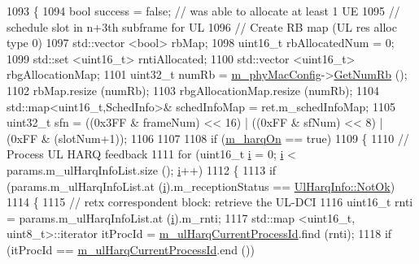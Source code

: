 \begin{DoxyCode}
1093 \{
1094         \textcolor{keywordtype}{bool} success = \textcolor{keyword}{false}; \textcolor{comment}{// was able to allocate at least 1 UE}
1095         \textcolor{comment}{// schedule slot in n+3th subframe for UL}
1096         \textcolor{comment}{// Create RB map (UL res alloc type 0)}
1097         std::vector <bool> rbMap;
1098   uint16\_t rbAllocatedNum = 0;
1099         std::set <uint16\_t> rntiAllocated;
1100         std::vector <uint16\_t> rbgAllocationMap;
1101         uint32\_t numRb = \hyperlink{classns3_1_1MmWaveMacScheduler_a24d7af4971d2e500fe543cefbafa2fd9}{m\_phyMacConfig}->\hyperlink{classns3_1_1MmWavePhyMacCommon_a4c5f323fd722d6eec52efda5d76f97ad}{GetNumRb} ();
1102         rbMap.resize (numRb);
1103         rbgAllocationMap.resize (numRb);
1104         std::map<uint16\_t,SchedInfo>& schedInfoMap = ret.m\_schedInfoMap;
1105         uint32\_t sfn =  ((0x3FF & frameNum) << 16) | ((0xFF & sfNum) << 8) | (0xFF & (slotNum+1));
1106 
1107 
1108         \textcolor{keywordflow}{if} (\hyperlink{classns3_1_1MmWaveRrMacScheduler_ad8bb79b5853000b363b42a158633a942}{m\_harqOn} == \textcolor{keyword}{true})
1109         \{
1110                 \textcolor{comment}{//   Process UL HARQ feedback}
1111                 \textcolor{keywordflow}{for} (uint16\_t \hyperlink{bernuolliDistribution_8m_a6f6ccfcf58b31cb6412107d9d5281426}{i} = 0; \hyperlink{bernuolliDistribution_8m_a6f6ccfcf58b31cb6412107d9d5281426}{i} < params.m\_ulHarqInfoList.size (); \hyperlink{bernuolliDistribution_8m_a6f6ccfcf58b31cb6412107d9d5281426}{i}++)
1112                 \{
1113                         \textcolor{keywordflow}{if} (params.m\_ulHarqInfoList.at (\hyperlink{bernuolliDistribution_8m_a6f6ccfcf58b31cb6412107d9d5281426}{i}).m\_receptionStatus == 
      \hyperlink{structns3_1_1UlHarqInfo_af1ea9a1ce02c9b4a551ac978484a4336a488db5f30de0c73647fed90c4a994a83}{UlHarqInfo::NotOk})
1114                         \{
1115                                 \textcolor{comment}{// retx correspondent block: retrieve the UL-DCI}
1116                                 uint16\_t rnti = params.m\_ulHarqInfoList.at (\hyperlink{bernuolliDistribution_8m_a6f6ccfcf58b31cb6412107d9d5281426}{i}).m\_rnti;
1117                                 std::map <uint16\_t, uint8\_t>::iterator itProcId = 
      \hyperlink{classns3_1_1MmWaveRrMacScheduler_a9d9d27b704770d34cb1ce158e9ed51ba}{m\_ulHarqCurrentProcessId}.find (rnti);
1118                                 \textcolor{keywordflow}{if} (itProcId == \hyperlink{classns3_1_1MmWaveRrMacScheduler_a9d9d27b704770d34cb1ce158e9ed51ba}{m\_ulHarqCurrentProcessId}.end ())

\end{DoxyCode}

